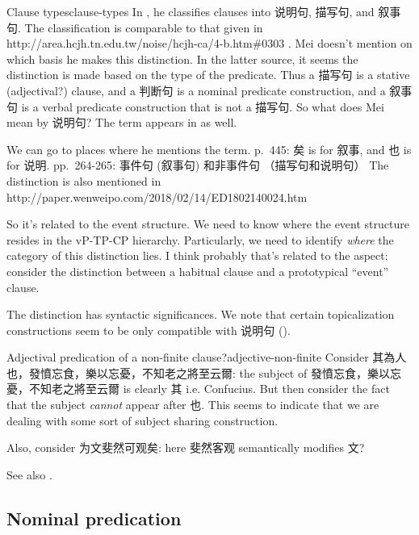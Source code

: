 \documentclass[UTF8, a4paper, oneside, scheme=plain, 12pt]{ctexrep}
\newcommand*{\citepage}[1]{p.~{#1}}
\newcommand*{\citepages}[1]{pp.~{#1}}
\begin{document}
\begin{todobox}{Clause types}{clause-types}
    In \citet[\citepage{131}]{meiguang2018},
    he classifies clauses into 说明句, 描写句, and 叙事句.
    The classification is comparable to that given in  http://area.hcjh.tn.edu.tw/noise/hcjh-ca/4-b.htm\#0303 .
    Mei doesn't mention on which basis he makes this distinction.
    In the latter source, it seems the distinction is made based on the type of the predicate.
    Thus a 描写句 is a stative (adjectival?) clause,
    and a 判断句 is a nominal predicate construction,
    and a 叙事句 is a verbal predicate construction that is not a 描写句.
    So what does Mei mean by 说明句?
    The term appears in \citet{li2004grammar} as well.


    We can go to places where he mentions the term.
    \citepage{445}: 矣 is for 叙事, and 也 is for 说明.
    \citepages{264-265}: 事件句 (叙事句) 和非事件句 （描写句和说明句）
    The distinction is also mentioned in http://paper.wenweipo.com/2018/02/14/ED1802140024.htm
    
    So it's related to the event structure.
    We need to know where the event structure resides in the vP-TP-CP hierarchy.
    Particularly, we need to identify \emph{where} the category of this distinction lies.
    I think probably that's related to the aspect:
    consider the distinction between a habitual clause and a prototypical ``event'' clause.
    
    The distinction has syntactic significances.
    We note that certain topicalization constructions seem to be only compatible with 说明句
    ().
\end{todobox}

\begin{todobox}{Adjectival predication of a non-finite clause?}{adjective-non-finite}
    Consider 其為人也，發憤忘食，樂以忘憂，不知老之將至云爾:
    the subject of 發憤忘食，樂以忘憂，不知老之將至云爾 is clearly 其 i.e. Confucius.
    But then consider the fact that the subject \emph{cannot} appear after 也.
    This seems to indicate that we are dealing with some sort of subject sharing construction.

    Also, consider 为文斐然可观矣: here 斐然客观 semantically modifies 文?

    See also .
\end{todobox}

\subsection{Nominal predication}\label{sec:grammatical.clause.nominal}
\end{document}
